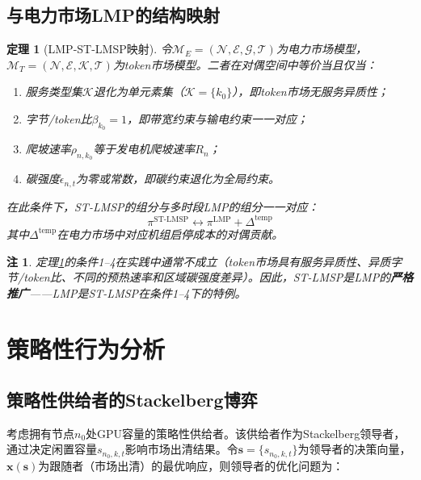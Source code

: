 \documentclass[11pt,a4paper,twocolumn]{article}
\newtheorem{theorem}{定理}[section]
\newtheorem{remark}{注}[section]
\begin{document}
\subsection{与电力市场LMP的结构映射}

\begin{theorem}[LMP-ST-LMSP映射]
\label{thm:mapping}
令$\mathcal{M}_E = (\mathcal{N}, \mathcal{E}, \mathcal{G}, \mathcal{T})$为电力市场模型，$\mathcal{M}_T = (\mathcal{N}, \mathcal{E}, \mathcal{K}, \mathcal{T})$为token市场模型。二者在对偶空间中等价当且仅当：
\begin{enumerate}[leftmargin=*]
\item 服务类型集$\mathcal{K}$退化为单元素集（$\mathcal{K} = \{k_0\}$），即token市场无服务异质性；
\item 字节/token比$\beta_{k_0} = 1$，即带宽约束与输电约束一一对应；
\item 爬坡速率$\rho_{n,k_0}$等于发电机爬坡速率$R_n$；
\item 碳强度$\epsilon_{n,t}$为零或常数，即碳约束退化为全局约束。
\end{enumerate}
在此条件下，ST-LMSP的组分与多时段LMP的组分一一对应：
\begin{equation}
\pi^{\text{ST-LMSP}} \leftrightarrow \pi^{\text{LMP}} + \Delta^{\text{temp}}
\label{eq:mapping}
\end{equation}
其中$\Delta^{\text{temp}}$在电力市场中对应机组启停成本的对偶贡献。
\end{theorem}

\begin{remark}
定理\ref{thm:mapping}的条件1--4在实践中通常不成立（token市场具有服务异质性、异质字节/token比、不同的预热速率和区域碳强度差异）。因此，ST-LMSP是LMP的\textbf{严格推广}——LMP是ST-LMSP在条件1--4下的特例。
\end{remark}

\section{策略性行为分析}

\subsection{策略性供给者的Stackelberg博弈}

考虑拥有节点$n_0$处GPU容量的策略性供给者。该供给者作为Stackelberg领导者，通过决定闲置容量$s_{n_0,k,t}$影响市场出清结果。令$\mathbf{s} = \{s_{n_0,k,t}\}$为领导者的决策向量，$\mathbf{x}(\mathbf{s})$为跟随者（市场出清）的最优响应，则领导者的优化问题为：
\end{document}
